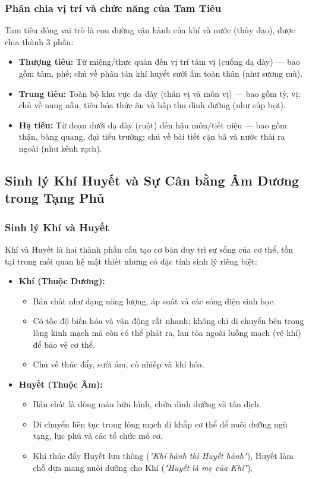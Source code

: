 \subsubsection{Phân chia vị trí và chức năng của Tam Tiêu}
Tam tiêu đóng vai trò là con đường vận hành của khí và nước (thủy đạo), được chia thành 3 phần:
\begin{itemize}
    \item \textbf{Thượng tiêu:} Từ miệng/thực quản đến vị trí tâm vị (cuống dạ dày) — bao gồm tâm, phế; chủ về phân tán khí huyết sưởi ấm toàn thân (như sương mù).
    \item \textbf{Trung tiêu:} Toàn bộ khu vực dạ dày (thân vị và môn vị) — bao gồm tỳ, vị; chủ về nung nấu, tiêu hóa thức ăn và hấp thu dinh dưỡng (như súp bọt).
    \item \textbf{Hạ tiêu:} Từ đoạn dưới dạ dày (ruột) đến hậu môn/tiết niệu — bao gồm thận, bàng quang, đại tiểu trường; chủ về bài tiết cặn bã và nước thải ra ngoài (như kênh rạch).
\end{itemize}


\subsection{Sinh lý Khí Huyết và Sự Cân bằng Âm Dương trong Tạng Phủ}

\subsubsection{Sinh lý Khí và Huyết}
Khí và Huyết là hai thành phần cấu tạo cơ bản duy trì sự sống của cơ thể, tồn tại trong mối quan hệ mật thiết nhưng có đặc tính sinh lý riêng biệt:
\begin{itemize}
    \item \textbf{Khí (Thuộc Dương):}
    \begin{itemize}
        \item Bản chất như dạng năng lượng, áp suất và các sóng điện sinh học.
        \item Có tốc độ biến hóa và vận động rất nhanh; không chỉ di chuyển bên trong lòng kinh mạch mà còn có thể phát ra, lan tỏa ngoài luồng mạch (vệ khí) để bảo vệ cơ thể.
        \item Chủ về thúc đẩy, sưởi ấm, cố nhiếp và khí hóa.
    \end{itemize}

    \item \textbf{Huyết (Thuộc Âm):}
    \begin{itemize}
        \item Bản chất là dòng máu hữu hình, chứa dinh dưỡng và tân dịch.
        \item Di chuyển liên tục trong lòng mạch đi khắp cơ thể để nuôi dưỡng ngũ tạng, lục phủ và các tổ chức mô cơ.
        \item Khí thúc đẩy Huyết lưu thông (\textit{"Khí hành thì Huyết hành"}), Huyết làm chỗ dựa mang nuôi dưỡng cho Khí (\textit{"Huyết là mẹ của Khí"}).
    \end{itemize}
\end{itemize}

